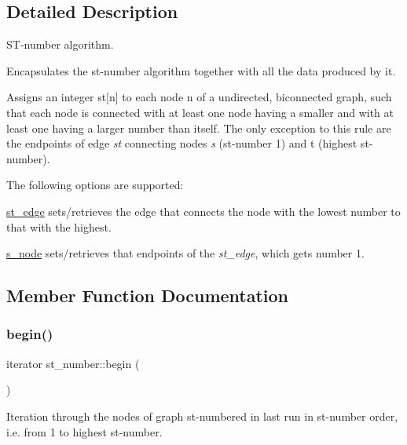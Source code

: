 \subsection{Detailed Description}
S\+T-\/number algorithm. 

Encapsulates the st-\/number algorithm together with all the data produced by it. 

Assigns an integer {\ttfamily st\mbox{[}n\mbox{]}} to each node {\ttfamily n} of a undirected, biconnected graph, such that each node is connected with at least one node having a smaller and with at least one having a larger number than itself. The only exception to this rule are the endpoints of edge {\itshape st} connecting nodes {\itshape s} (st-\/number 1) and {\ttfamily t} (highest st-\/number). 

The following options are supported\+:
\begin{DoxyItemize}
\item \mbox{\hyperlink{classst__number_a1564af6f603160105643f22bf2f6955b}{st\+\_\+edge}} sets/retrieves the edge that connects the node with the lowest number to that with the highest.
\item \mbox{\hyperlink{classst__number_aa607c9aaa5a4d9c45e5854ce672f0fda}{s\+\_\+node}} sets/retrieves that endpoints of the {\itshape st\+\_\+edge}, which gets number 1. 
\end{DoxyItemize}

\subsection{Member Function Documentation}
\mbox{\label{classst__number_a1eddb2577b16109d22cde98a8ffde057}} 
\subsubsection{\texorpdfstring{begin()}{begin()}}
{\footnotesize\ttfamily iterator st\+\_\+number\+::begin (\begin{DoxyParamCaption}{ }\end{DoxyParamCaption})\hspace{0.3cm}{\ttfamily [inline]}}



Iteration through the nodes of graph st-\/numbered in last run in st-\/number order, i.\+e. from 1 to highest st-\/number. 

